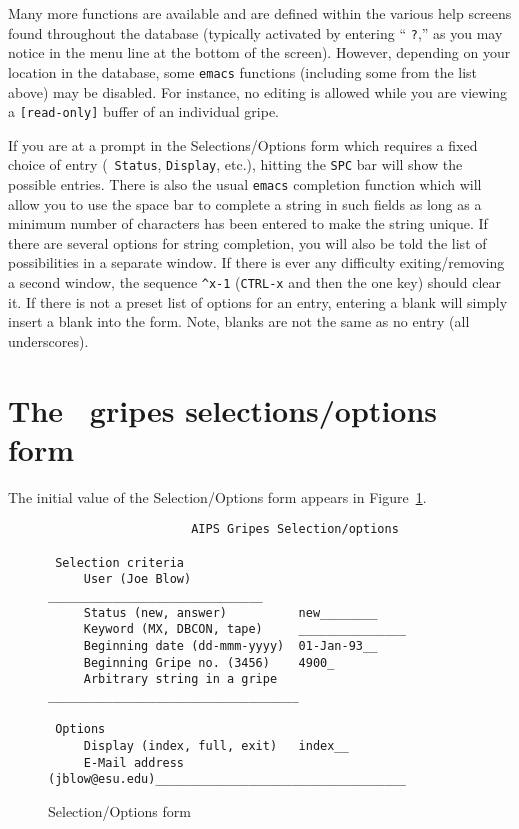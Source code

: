 Many more functions are available and are defined within the various
help screens found throughout the database (typically activated by
entering `` {\tt ?},'' as you may notice in the menu line at the
bottom of the screen).  However, depending on your location in the
database, some {\tt emacs} functions (including some from the list
above) may be disabled.  For instance, no editing is allowed while you
are viewing a {\tt [read-only]} buffer of an individual gripe.

If you are at a prompt in the Selections/Options form which requires a
fixed choice of entry (\ie\ {\tt Status}, {\tt Display}, etc.),
hitting the {\tt SPC} bar will show the possible entries.  There is
also the usual {\tt emacs} completion function which will allow you to
use the space bar to complete a string in such fields as long as a
minimum number of characters has been entered to make the string
unique.  If there are several options for string completion, you will
also be told the list of possibilities in a separate window.  If there
is ever any difficulty exiting/removing a second window, the sequence
{\tt \^{ }x-1} ({\tt CTRL-x} and then the one key) should clear it.  If
there is not a preset list of options for an entry, entering a blank
will simply insert a blank into the form.  Note, blanks are not the
same as no entry (all underscores).

\section{The \AIPS\ gripes selections/options form}

The initial value of the Selection/Options form appears in
Figure~\ref{fig:SelOpt}.
\begin{figure}
\begin{center}
\begin{verbatim}
                    AIPS Gripes Selection/options

 Selection criteria
     User (Joe Blow)               ______________________________
     Status (new, answer)          new________
     Keyword (MX, DBCON, tape)     _______________
     Beginning date (dd-mmm-yyyy)  01-Jan-93__
     Beginning Gripe no. (3456)    4900_
     Arbitrary string in a gripe   ___________________________________

 Options
     Display (index, full, exit)   index__
     E-Mail address (jblow@esu.edu)___________________________________
\end{verbatim}
\end{center}
\caption{Selection/Options form}
\label{fig:SelOpt}
\end{figure}

